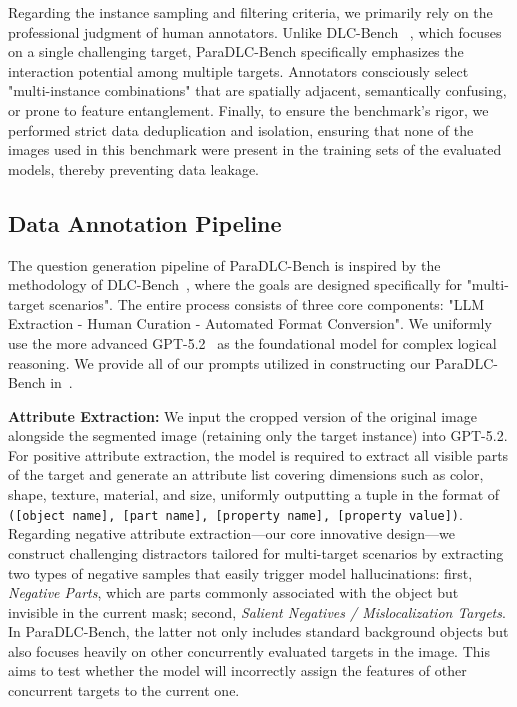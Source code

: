 Regarding the instance sampling and filtering criteria, we primarily rely on the professional judgment of human annotators. Unlike DLC-Bench ~\citep{lian2025describe}, which focuses on a single challenging target, ParaDLC-Bench specifically emphasizes the interaction potential among multiple targets. Annotators consciously select "multi-instance combinations" that are spatially adjacent, semantically confusing, or prone to feature entanglement. Finally, to ensure the benchmark's rigor, we performed strict data deduplication and isolation, ensuring that none of the images used in this benchmark were present in the training sets of the evaluated models, thereby preventing data leakage.

\subsection{Data Annotation Pipeline}
The question generation pipeline of ParaDLC-Bench is inspired by the methodology of DLC-Bench~\citep{lian2025describe}, where the goals are designed specifically for "multi-target scenarios". The entire process consists of three core components: "LLM Extraction - Human Curation - Automated Format Conversion". 
%
We uniformly use the more advanced GPT-5.2~\citep{gpt5.2} as the foundational model for complex logical reasoning. 
%
We provide all of our prompts utilized in constructing our ParaDLC-Bench in~.


\textbf{Attribute Extraction:} We input the cropped version of the original image alongside the segmented image (retaining only the target instance) into GPT-5.2. For positive attribute extraction, the model is required to extract all visible parts of the target and generate an attribute list covering dimensions such as color, shape, texture, material, and size, uniformly outputting a tuple in the format of \texttt{([object name], [part name], [property name], [property value])}. Regarding negative attribute extraction—our core innovative design—we construct challenging distractors tailored for multi-target scenarios by extracting two types of negative samples that easily trigger model hallucinations: first, \textit{Negative Parts}, which are parts commonly associated with the object but invisible in the current mask; second, \textit{Salient Negatives / Mislocalization Targets}. In ParaDLC-Bench, the latter not only includes standard background objects but also focuses heavily on other concurrently evaluated targets in the image. This aims to test whether the model will incorrectly assign the features of other concurrent targets to the current one.

